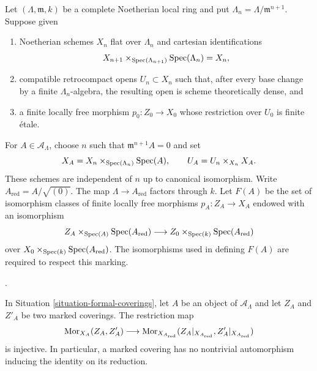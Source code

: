 \begin{situation}
\label{situation-formal-coverings}
Let $(\Lambda, \mathfrak m, k)$ be a complete Noetherian local ring and put
$\Lambda_n = \Lambda/\mathfrak m^{n + 1}$. Suppose given
\begin{enumerate}
\item Noetherian schemes $X_n$ flat over $\Lambda_n$ and cartesian
identifications
$$
X_{n + 1} \times_{\mathop{\mathrm{Spec}}(\Lambda_{n + 1})} \mathop{\mathrm{Spec}}(\Lambda_n) = X_n,
$$
\item compatible retrocompact opens $U_n \subset X_n$ such that, after every
base change by a finite $\Lambda_n$-algebra, the resulting open is scheme
theoretically dense, and
\item a finite locally free morphism $p_0 : Z_0 \to X_0$ whose restriction
over $U_0$ is finite \'etale.
\end{enumerate}
For $A \in \mathcal{A}_\Lambda$, choose $n$ such that
$\mathfrak m^{n + 1}A = 0$ and set
$$
X_A = X_n \times_{\mathop{\mathrm{Spec}}(\Lambda_n)} \mathop{\mathrm{Spec}}(A),
\qquad
U_A = U_n \times_{X_n} X_A.
$$
These schemes are independent of $n$ up to canonical isomorphism. Write
$A_{\mathrm{red}} = A/\sqrt{(0)}$. The map $\Lambda \to A_{\mathrm{red}}$
factors through $k$. Let $F(A)$ be the set of isomorphism classes of finite
locally free morphisms
$p_A : Z_A \to X_A$ endowed with an isomorphism
$$
Z_A \times_{\mathop{\mathrm{Spec}}(A)} \mathop{\mathrm{Spec}}(A_{\mathrm{red}})
\longrightarrow
Z_0 \times_{\mathop{\mathrm{Spec}}(k)} \mathop{\mathrm{Spec}}(A_{\mathrm{red}})
$$
over $X_0 \times_{\mathop{\mathrm{Spec}}(k)} \mathop{\mathrm{Spec}}(A_{\mathrm{red}})$.
The isomorphisms used in defining $F(A)$ are required to respect this marking.
\end{situation}

\begin{lemma}
\label{lemma-formal-coverings-rigidity}
\begin{reference}
\cite[Expos\'e 195, C, Section 5, p. 387]{FGA}.
\end{reference}
In Situation \ref{situation-formal-coverings}, let $A$ be an object of
$\mathcal{A}_\Lambda$ and let $Z_A$ and $Z'_A$ be two marked coverings. The
restriction map
$$
\mathop{\mathrm{Mor}}\nolimits_{X_A}(Z_A, Z'_A)
\longrightarrow
\mathop{\mathrm{Mor}}\nolimits_{X_{A_{\mathrm{red}}}}
(Z_A|_{X_{A_{\mathrm{red}}}}, Z'_A|_{X_{A_{\mathrm{red}}}})
$$
is injective. In particular, a marked covering has no nontrivial
automorphism inducing the identity on its reduction.
\end{lemma}

